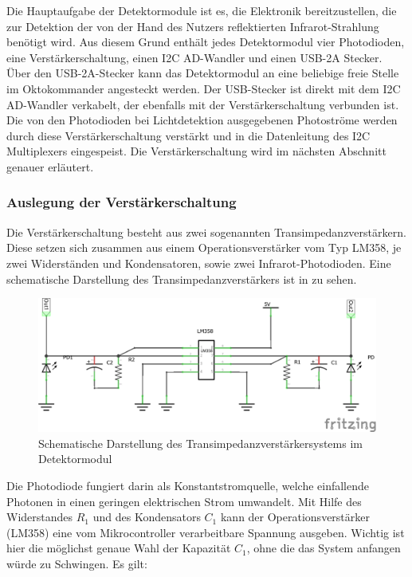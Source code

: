 Die Hauptaufgabe der Detektormodule ist es, die Elektronik bereitzustellen, die zur Detektion der von der Hand des Nutzers reflektierten Infrarot-Strahlung benötigt wird. Aus diesem Grund enthält jedes Detektormodul vier Photodioden, eine Verstärkerschaltung, einen I2C AD-Wandler und einen USB-2A Stecker. Über den USB-2A-Stecker kann das Detektormodul an eine beliebige freie Stelle im Oktokommander angesteckt werden. Der USB-Stecker ist direkt mit dem I2C AD-Wandler verkabelt, der ebenfalls mit der Verstärkerschaltung verbunden ist. Die von den Photodioden bei Lichtdetektion ausgegebenen Photoströme werden durch diese Verstärkerschaltung verstärkt und in die Datenleitung des I2C Multiplexers eingespeist. Die Verstärkerschaltung wird im nächsten Abschnitt genauer erläutert.


\subsubsection*{Auslegung der Verstärkerschaltung}
Die Verstärkerschaltung besteht aus zwei sogenannten Transimpedanzverstärkern. Diese setzen sich zusammen aus einem Operationsverstärker vom Typ LM358, je zwei Widerständen und Kondensatoren, sowie zwei Infrarot-Photodioden. Eine schematische Darstellung des Transimpedanzverstärkers ist in  zu sehen.
\begin{figure}[H]
	\centering
	\includegraphics[scale=0.75]{../figures/Transimpedanz.png}
	\caption{Schematische Darstellung des Transimpedanzverstärkersystems im Detektormodul}
	\label{fig:Transimpedanz}
\end{figure}
\noindent
Die Photodiode fungiert darin als Konstantstromquelle, welche einfallende Photonen in einen geringen elektrischen Strom umwandelt. Mit Hilfe des Widerstandes $R_1$ und des Kondensators $C_1$ kann der Operationsverstärker (LM358) eine vom Mikrocontroller verarbeitbare Spannung ausgeben. Wichtig ist hier die möglichst genaue Wahl der Kapazität $C_1$, ohne die das System anfangen würde zu Schwingen. Es gilt:
